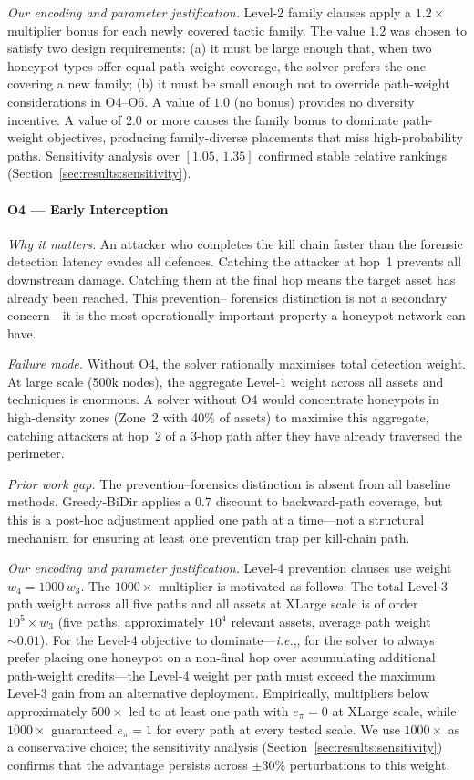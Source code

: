 \documentclass[journal]{IEEEtran}
\newcommand{\ie}{\emph{i.e.},}
\begin{document}
\textit{Our encoding and parameter justification.}
Level-2 family clauses apply a $1.2\times$ multiplier bonus for
each newly covered tactic family. The value $1.2$ was chosen to
satisfy two design requirements: (a) it must be large enough that,
when two honeypot types offer equal path-weight coverage, the solver
prefers the one covering a new family; (b) it must be small enough
not to override path-weight considerations in O4--O6. A value of
$1.0$ (no bonus) provides no diversity incentive. A value of $2.0$
or more causes the family bonus to dominate path-weight objectives,
producing family-diverse placements that miss high-probability paths.
Sensitivity analysis over $[1.05,\,1.35]$ confirmed stable relative
rankings (Section~\ref{sec:results:sensitivity}).

\paragraph{O4 --- Early Interception}
\textit{Why it matters.}
An attacker who completes the kill chain faster than the forensic
detection latency evades all defences. Catching the attacker at
hop~1 prevents all downstream damage. Catching them at the final hop
means the target asset has already been reached. This prevention--
forensics distinction is not a secondary concern---it is the most
operationally important property a honeypot network can have.

\textit{Failure mode.}
Without O4, the solver rationally maximises total detection weight.
At large scale (500k nodes), the aggregate Level-1 weight across
all assets and techniques is enormous. A solver without O4 would
concentrate honeypots in high-density zones (Zone~2 with 40\% of
assets) to maximise this aggregate, catching attackers at hop~2 of
a 3-hop path after they have already traversed the perimeter.

\textit{Prior work gap.}
The prevention--forensics distinction is absent from all baseline
methods. Greedy-BiDir applies a $0.7$ discount to backward-path
coverage, but this is a post-hoc adjustment applied one path at a
time---not a structural mechanism for ensuring at least one prevention
trap per kill-chain path.

\textit{Our encoding and parameter justification.}
Level-4 prevention clauses use weight $w_4=1000\,w_3$. The
$1000\times$ multiplier is motivated as follows. The total Level-3
path weight across all five paths and all assets at XLarge scale is
of order $10^5 \times w_3$ (five paths, approximately $10^4$
relevant assets, average path weight ${\sim}0.01$). For the Level-4
objective to dominate---\ie, for the solver to always prefer placing
one honeypot on a non-final hop over accumulating additional
path-weight credits---the Level-4 weight per path must exceed the
maximum Level-3 gain from an alternative deployment. Empirically,
multipliers below approximately $500\times$ led to at least one path
with $e_\pi=0$ at XLarge scale, while $1000\times$ guaranteed
$e_\pi=1$ for every path at every tested scale. We use $1000\times$
as a conservative choice; the sensitivity analysis
(Section~\ref{sec:results:sensitivity}) confirms that the advantage
persists across $\pm30\%$ perturbations to this weight.
\end{document}
